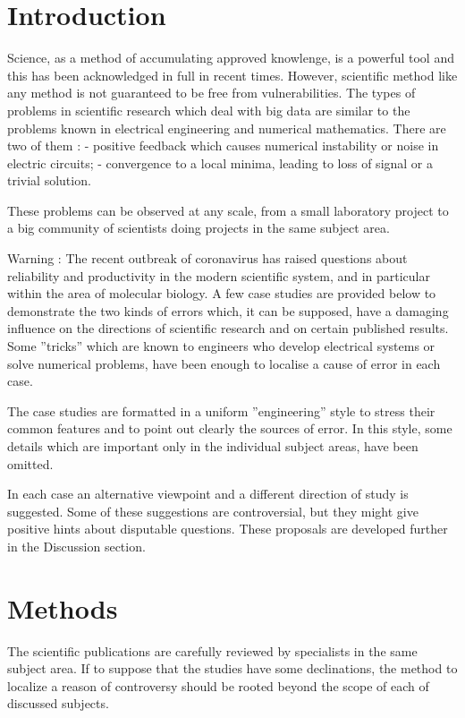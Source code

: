 \documentclass[12pt,aps]{revtex4}
\begin{document}
\section{Introduction}

Science, as a method of accumulating approved knowlenge, is a powerful tool and this
has been acknowledged in full in recent times. However, scientific method like any
method is not guaranteed to be free from vulnerabilities. The types of problems in
scientific research which deal with big data are similar to the problems known in
electrical engineering and numerical mathematics. There are two of them :   -
positive feedback which causes numerical instability or noise in electric circuits; 
 - convergence to a local minima, leading to loss of signal or a trivial solution.

These problems can be observed at any scale, from a small laboratory project to a
big community of scientists doing projects in the same subject area.

Warning :   The recent outbreak of coronavirus has raised questions about
reliability and productivity in the modern scientific system, and in particular
within the area of molecular biology. A few case studies are provided below to
demonstrate the two kinds of errors which, it can be supposed, have a damaging
influence on the directions of scientific research and on certain published results.
Some ''tricks'' which are known to engineers who develop electrical systems or solve
numerical problems, have been enough to localise a cause of error in each case.

The case studies are formatted in a uniform ''engineering'' style to stress their
common features and to point out clearly the sources of error.  In this style, some
details which are important only in the individual subject areas, have been omitted.

In each case an alternative viewpoint and a different direction of study is
suggested. Some of these suggestions are controversial, but they might give positive
hints about disputable questions. These proposals are developed further in the Discussion section.
   


\section{Methods}

The scientific publications are carefully reviewed by specialists in the same subject area. If to suppose that the studies have some declinations, the method to localize a reason of controversy should be rooted beyond the scope of each of discussed subjects. 
\end{document}
